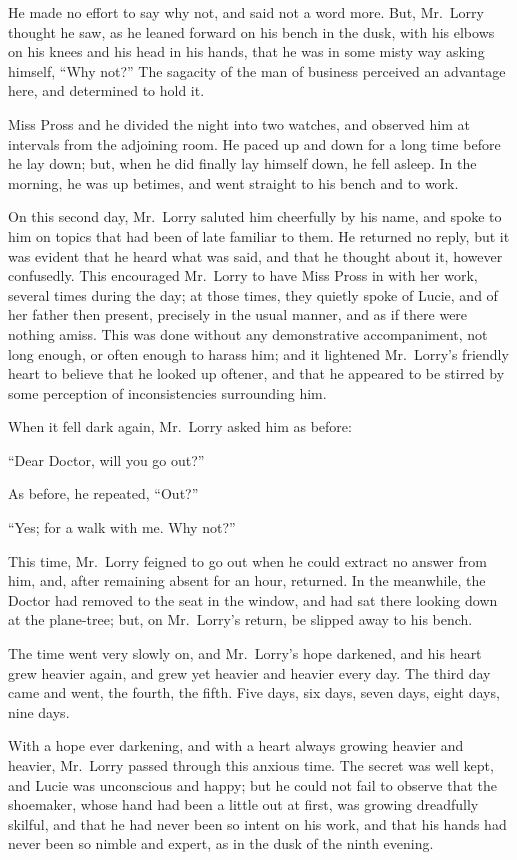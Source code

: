 He made no effort to say why not, and said not a word more.  But,
Mr.\ Lorry thought he saw, as he leaned forward on his bench in the
dusk, with his elbows on his knees and his head in his hands, that he
was in some misty way asking himself, ``Why not?''  The sagacity of the
man of business perceived an advantage here, and determined to hold it.

Miss Pross and he divided the night into two watches, and observed him
at intervals from the adjoining room.  He paced up and down for a long
time before he lay down; but, when he did finally lay himself down,
he fell asleep.  In the morning, he was up betimes, and went straight
to his bench and to work.

On this second day, Mr.\ Lorry saluted him cheerfully by his name, and
spoke to him on topics that had been of late familiar to them.  He
returned no reply, but it was evident that he heard what was said,
and that he thought about it, however confusedly.  This encouraged
Mr.\ Lorry to have Miss Pross in with her work, several times during the
day; at those times, they quietly spoke of Lucie, and of her father then
present, precisely in the usual manner, and as if there were nothing
amiss.  This was done without any demonstrative accompaniment, not long
enough, or often enough to harass him; and it lightened Mr.\ Lorry's
friendly heart to believe that he looked up oftener, and that he appeared
to be stirred by some perception of inconsistencies surrounding him.

When it fell dark again, Mr.\ Lorry asked him as before:

``Dear Doctor, will you go out?''

As before, he repeated, ``Out?''

``Yes; for a walk with me.  Why not?''

This time, Mr.\ Lorry feigned to go out when he could extract no answer
from him, and, after remaining absent for an hour, returned.  In the
meanwhile, the Doctor had removed to the seat in the window, and had
sat there looking down at the plane-tree; but, on Mr.\ Lorry's return,
be slipped away to his bench.

The time went very slowly on, and Mr.\ Lorry's hope darkened, and his
heart grew heavier again, and grew yet heavier and heavier every day.
The third day came and went, the fourth, the fifth.  Five days, six
days, seven days, eight days, nine days.

With a hope ever darkening, and with a heart always growing heavier
and heavier, Mr.\ Lorry passed through this anxious time.  The secret
was well kept, and Lucie was unconscious and happy; but he could not
fail to observe that the shoemaker, whose hand had been a little out
at first, was growing dreadfully skilful, and that he had never been
so intent on his work, and that his hands had never been so nimble and
expert, as in the dusk of the ninth evening.



